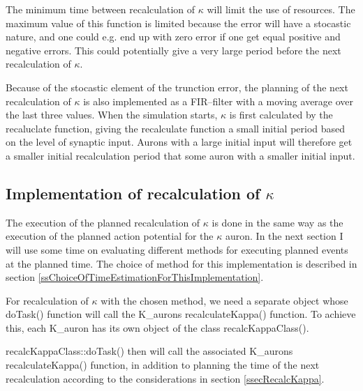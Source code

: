 		The minimum time between recalculation of $\kappa$ will limit the use of resources. %
		The maximum value of this function is limited because the error will have a stocastic nature, and one could e.g. end up with zero error if one get equal positive and negative errors.
		This could potentially give a very large period before the next recalculation of $\kappa$.

		Because of the stocastic element of the trunction error, the planning of the next recalculation of $\kappa$ is also implemented as a FIR--filter with a moving average over the last three values.
		When the simulation starts, $\kappa$ is first calculated by the recaluclate function, giving the recalculate function a small initial period based on the level of synaptic input.
		Aurons with a large initial input will therefore get a smaller initial recalculation period that some auron with a smaller initial input. %

		\subsection{Implementation of recalculation of $\kappa$}
		The execution of the planned recalculation of $\kappa$ is done in the same way as the execution of the planned action potential for the $\kappa$ auron.
		In the next section I will use some time on evaluating different methods for executing planned events at the planned time.
		The choice of method for this implementation is described in section \ref{ssChoiceOfTimeEstimationForThisImplementation}.
		
		For recalculation of $\kappa$ with the chosen method, we need a separate object whose doTask() function will call the K\_aurons recalculateKappa() function.
		To achieve this, each K\_auron has its own object of the class recalcKappaClass().

		recalcKappaClass::doTask() then will call the associated K\_aurons recalculateKappa() function, in addition to planning the time of the next recalculation according to the considerations in section \ref{ssecRecalcKappa}.
		

